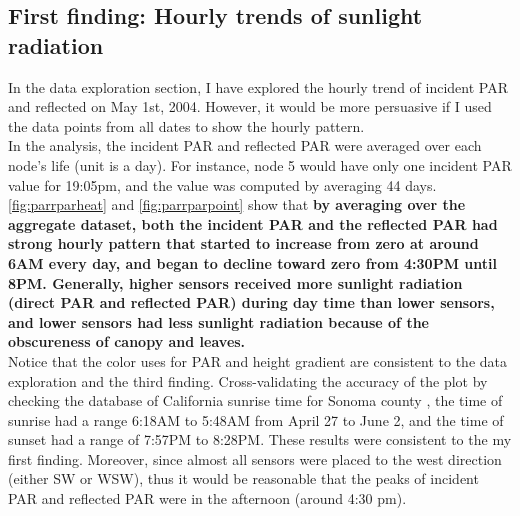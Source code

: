 \documentclass[11pt]{article}
\begin{document}
{\subsection{First finding: Hourly trends of sunlight radiation}
In the data exploration section, I have explored the hourly trend of incident PAR and reflected on May 1st, 2004. However, it would be more persuasive if I used the data points from all dates to show the hourly pattern.\\
In the analysis, the incident PAR and reflected PAR were averaged over each node's life (unit is a day). For instance, node 5 would have only one incident PAR value for 19:05pm, and the value was computed by averaging 44 days. \ref{fig:parrparheat} and \ref{fig:parrparpoint} show that \textbf{by averaging over the aggregate dataset, both the incident PAR and the reflected PAR had strong hourly pattern that started to increase from zero at around 6AM every day, and began to decline toward zero from 4:30PM until 8PM. Generally, higher sensors received more sunlight radiation (direct PAR and reflected PAR) during day time than lower sensors, and lower sensors had less sunlight radiation because of the obscureness of canopy and leaves.}\\ Notice that the color uses for PAR and height gradient are consistent to the data exploration and the third finding.
Cross-validating the accuracy of the plot by checking the database of California sunrise time for Sonoma county \cite{sunrise}, the time of sunrise had a range 6:18AM to 5:48AM from April 27 to June 2, and the time of sunset had a range of 7:57PM to 8:28PM. These results were consistent to the my first finding. Moreover, since almost all sensors were placed to the west direction (either SW or WSW), thus it would be reasonable that the peaks of incident PAR and reflected PAR were in the afternoon (around 4:30 pm). 
\begin{figure}[H]
\centering
\begin{subfigure}{.5\textwidth}
\centering

\end{subfigure}
\end{figure}}
\end{document}
